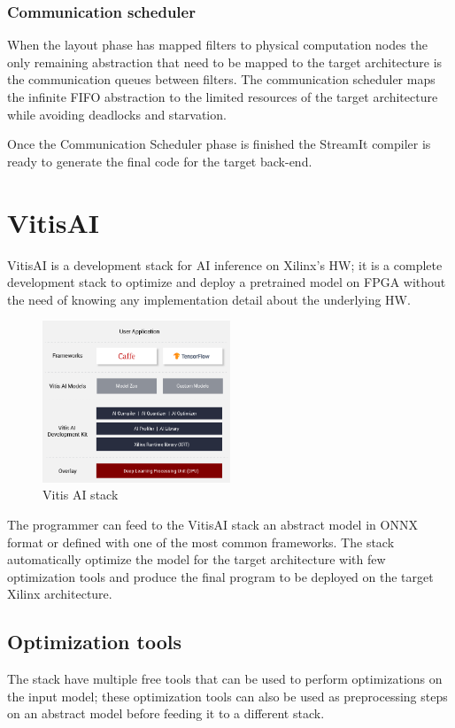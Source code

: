 \documentclass[../main.tex]{subfiles}
\begin{document}
\subsubsection{Communication scheduler}
When the layout phase has mapped filters to physical computation nodes the only remaining abstraction that need to be mapped to the target architecture is the communication queues between filters. The communication scheduler maps the infinite FIFO abstraction to the limited resources of the target architecture while avoiding deadlocks and starvation.

Once the Communication Scheduler phase is finished the StreamIt compiler is ready to generate the final code for the target back-end.

\newpage
\section{VitisAI}
\label{vitis}

VitisAI \cite{VitisAI} is a development stack for AI inference on Xilinx's HW; it is a complete development stack to optimize and deploy a pretrained model on FPGA without the need of knowing any implementation detail about the underlying HW.

\begin{figure}[h!]
  \includegraphics[width=0.5\textwidth]{images/Vitis-AI-Stack.png}
  \centering
  \caption{Vitis AI stack}
  \label{fig:VitisAIStack}
\end{figure}

The programmer can feed to the VitisAI stack an abstract model in ONNX format or defined with one of the most common frameworks. The stack automatically optimize the model for the target architecture with few optimization tools and produce the final program to be deployed on the target Xilinx architecture.

\subsection{Optimization tools}
The stack have multiple free tools that can be used to perform optimizations on the input model; these optimization tools can also be used as preprocessing steps on an abstract model before feeding it to a different stack.
\end{document}
